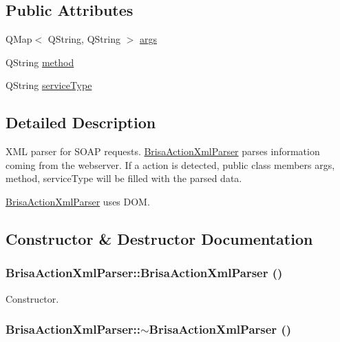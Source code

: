 \subsection*{Public Attributes}
\begin{DoxyCompactItemize}
\item 
QMap$<$ QString, QString $>$ \hyperlink{classBrisaUpnp_1_1BrisaActionXmlParser_a1bd26f5d3b9a6bb452973d420b6c8691}{args}
\item 
QString \hyperlink{classBrisaUpnp_1_1BrisaActionXmlParser_a2b691349bfddc01bf27faa8f492496cd}{method}
\item 
QString \hyperlink{classBrisaUpnp_1_1BrisaActionXmlParser_adef5fd463e49e6e622ce1aa243fa34e2}{serviceType}
\end{DoxyCompactItemize}


\subsection{Detailed Description}
XML parser for SOAP requests. \hyperlink{classBrisaUpnp_1_1BrisaActionXmlParser}{BrisaActionXmlParser} parses information coming from the webserver. If a action is detected, public class members args, method, serviceType will be filled with the parsed data.

\hyperlink{classBrisaUpnp_1_1BrisaActionXmlParser}{BrisaActionXmlParser} uses DOM. 

\subsection{Constructor \& Destructor Documentation}
\hypertarget{classBrisaUpnp_1_1BrisaActionXmlParser_aa5a6085184cf85e2a6e9f0227a448eb9}{
\subsubsection[{BrisaActionXmlParser}]{\setlength{\rightskip}{0pt plus 5cm}BrisaActionXmlParser::BrisaActionXmlParser ()}}
\label{classBrisaUpnp_1_1BrisaActionXmlParser_aa5a6085184cf85e2a6e9f0227a448eb9}


Constructor. \hypertarget{classBrisaUpnp_1_1BrisaActionXmlParser_a29d3e806481a99c1cfd9007bbf3f09c1}{
\subsubsection[{$\sim$BrisaActionXmlParser}]{\setlength{\rightskip}{0pt plus 5cm}BrisaActionXmlParser::$\sim$BrisaActionXmlParser ()}}
\label{classBrisaUpnp_1_1BrisaActionXmlParser_a29d3e806481a99c1cfd9007bbf3f09c1}


